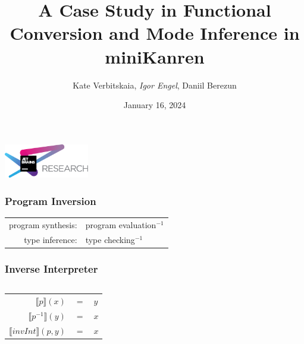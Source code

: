 \documentclass[xcolor=table, aspectratio=169]{beamer}
\title[Functional Conversion for miniKanren]{A Case Study in Functional Conversion and Mode Inference in miniKanren}
\institute[JetBrains Research]{
JetBrains Research

\vspace{1cm}
PEPM @ POPL 2024
}
\author[Igor]{Kate Verbitskaia, \emph{Igor Engel}, Daniil Berezun}
\date{January 16, 2024}
\begin{document}
{
\begin{frame}[fragile]
   \begin{center}
      \includegraphics[height=1.5cm]{pictures/jetbrainsResearch.pdf}
    \end{center}
  \titlepage
\end{frame}
}





\begin{frame}[fragile]
  \frametitle{Program Inversion}
  

\vfill

\begin{center}
  \begin{tabular}{rl}
    program synthesis: & program evaluation$^{-1}$ \\

    type inference: & type checking$^{-1}$
  \end{tabular}
\end{center}

\end{frame}

\begin{frame}[fragile]
  \frametitle{Inverse Interpreter}
  \begin{columns}[t]
    \begin{column}{0.49\textwidth}
      \begin{center} 
        \setlength{\tabcolsep}{0.1cm}
        \setlength{\extrarowheight}{10pt}
        \begin{tabular}{rcl}
          $\llbracket p \rrbracket (x)$ & $=$ & $y$ \\ 
          $\llbracket p^{-1} \rrbracket (y)$ & $=$ & $x$ \\ 
          $\llbracket invInt \rrbracket (p, y)$ & $=$ & $x$
        \end{tabular}
      \end{center}
    \end{column}
    \begin{column}{0.49\textwidth}
      \vspace{0.5cm}
      
    \end{column}
  \end{columns}
\end{frame}
\end{document}
